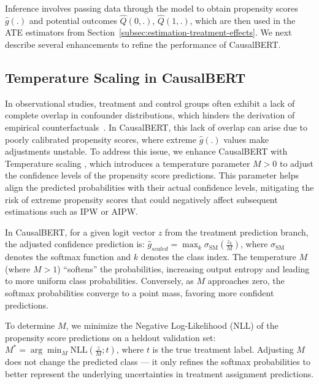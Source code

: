 \documentclass[11pt]{article}
\begin{document}
Inference involves passing data through the model to obtain propensity scores $\hat{g}(.)$ and potential outcomes $\hat{Q}(0, .)$, $\hat{Q}(1, .)$, which are then used in the ATE estimators from Section~\ref{subsec:estimation-treatment-effects}. We next describe several enhancements to refine the performance of CausalBERT.

\subsection{Temperature Scaling in CausalBERT}
\label{sec:temperature-scaling}
In observational studies,  treatment and control groups often exhibit a lack of complete overlap in confounder distributions, which hinders the derivation of empirical counterfactuals~\cite{gelman2021regression}. In CausalBERT, this lack of overlap can arise due to poorly calibrated propensity scores, where extreme $\hat{g}(.)$ values make adjustments unstable. 
To address this issue, we enhance CausalBERT with Temperature scaling \cite{guo2017calibration}, which introduces a temperature parameter \(M > 0\) to adjust the confidence levels of the propensity score predictions. This parameter helps align the predicted probabilities with their actual confidence levels, mitigating the risk of extreme propensity scores that could negatively affect subsequent estimations such as IPW or AIPW.

In CausalBERT, for a given logit vector \(z\) from the treatment  prediction branch, the adjusted confidence prediction is: $
    \hat{g}_{scaled} = \max_k \sigma_{\text{SM}}\left(\frac{z_k}{M}\right)$,
where \(\sigma_{\text{SM}}\) denotes the softmax function and \( k \) denotes the class index. The temperature \(M\) (where \(M > 1\)) ``softens'' the  probabilities, increasing output entropy and leading to more uniform class probabilities. Conversely, as \(M\) approaches zero, the softmax probabilities converge to a point mass, favoring more confident predictions.

To determine \( M \), we minimize the Negative Log-Likelihood (NLL) of the propensity score predictions on a heldout validation set: $
    M^* = \arg\min_{M} \text{NLL}\left(\frac{z}{M}; t\right)
$,
where \( t \) is the true treatment label. Adjusting \( M \) does not change the predicted class — it only refines the softmax probabilities to better represent the underlying uncertainties in treatment assignment predictions.
\end{document}
